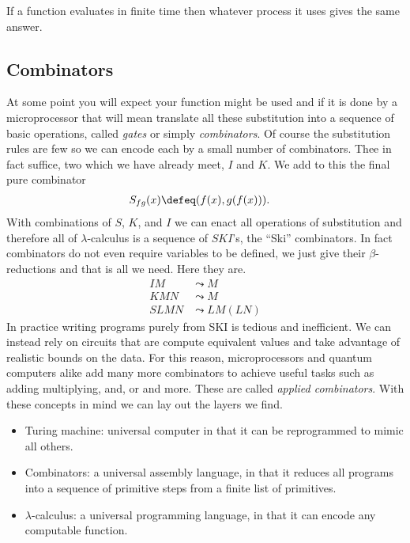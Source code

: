 \begin{corollary}
    If a function evaluates in finite time then whatever process it uses 
    gives the same answer.
\end{corollary}

\subsection{Combinators}
At some point you will expect your function might be used and if it is done 
by a microprocessor that will mean translate all these substitution into a 
sequence of basic operations, called \emph{gates} or simply \emph{combinators}.
Of course the substitution rules are few so we can encode each by a small 
number of combinators.  Thee in fact suffice, two which we have already meet, 
$I$ and $K$.  We add to this the final pure combinator 
\begin{align*}
    S_{fg}(x) & \defeq (f(x),g(f(x))).
\end{align*}
With combinations of $S$, $K$, and $I$ we can enact all operations of substitution
and therefore all of $\lambda$-calculus is a sequence of $SKI$'s, the ``Ski'' combinators.
In fact combinators do not even require variables to be defined, we just give their 
$\beta$-reductions and that is all we need.  Here they are.
\begin{align*}
    IM & \leadsto M\\
    KMN & \leadsto M\\
    SLMN & \leadsto LM(LN)
\end{align*}
In practice writing programs purely from SKI is tedious and inefficient.  We can 
instead rely on circuits that are compute equivalent values and take advantage 
of realistic bounds on the data.  For this reason, microprocessors and 
quantum computers alike add many more combinators to achieve useful tasks 
such as adding multiplying, and, or and more.  These are called \emph{applied combinators}.
With these concepts in mind we can lay out the layers we find.

\begin{itemize}
    \item Turing machine: universal computer in that it can be reprogrammed to 
    mimic all others.

    \item Combinators: a universal assembly language, in that it reduces all 
    programs into a sequence of primitive steps from a finite list of primitives.

    \item $\lambda$-calculus: a universal programming language, in that it can 
    encode any computable function.

\end{itemize}

